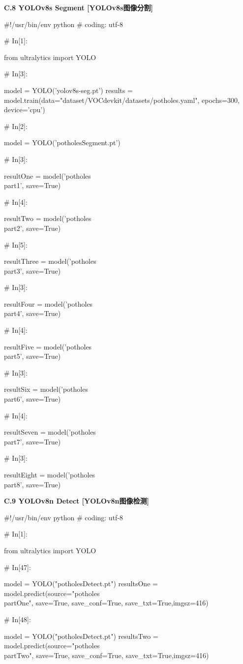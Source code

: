 \documentclass{MathorCupmodeling}
\begin{document}
\textbf{C.8 YOLOv8s Segment [YOLOv8s图像分割]}
\begin{python}
#!/usr/bin/env python
# coding: utf-8

# In[1]:


from ultralytics import YOLO

# In[3]:


model = YOLO('yolov8s-seg.pt')
results = model.train(data="dataset/VOCdevkit/datasets/potholes.yaml", epochs=300, device='cpu')

# In[2]:


model = YOLO('potholesSegment.pt')

# In[3]:


resultOne = model('potholes\\part1', save=True)

# In[4]:


resultTwo = model('potholes\\part2', save=True)

# In[5]:


resultThree = model('potholes\\part3', save=True)

# In[3]:


resultFour = model('potholes\\part4', save=True)

# In[4]:


resultFive = model('potholes\\part5', save=True)

# In[3]:


resultSix = model('potholes\\part6', save=True)

# In[4]:


resultSeven = model('potholes\\part7', save=True)

# In[3]:


resultEight = model('potholes\\part8', save=True)
\end{python}

\textbf{C.9 YOLOv8n Detect [YOLOv8n图像检测]}
\begin{python}
#!/usr/bin/env python
# coding: utf-8

# In[1]:


from ultralytics import YOLO


# In[47]:


model = YOLO("potholesDetect.pt")
resultsOne = model.predict(source="potholes\\partOne", save=True, save_conf=True, save_txt=True,imgsz=416)


# In[48]:


model = YOLO("potholesDetect.pt")
resultsTwo = model.predict(source="potholes\\partTwo", save=True, save_conf=True, save_txt=True,imgsz=416)
\end{python}
\end{document}
